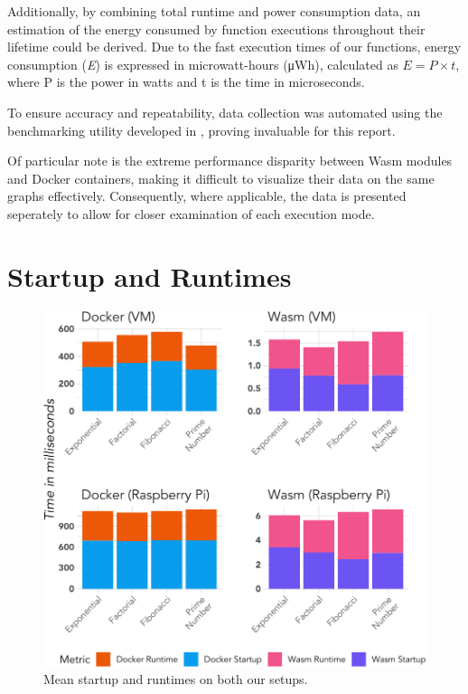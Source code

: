 \documentclass[
  table]{report}
\begin{document}
Additionally, by combining total runtime and power consumption data, an
estimation of the energy consumed by function executions throughout
their lifetime could be derived. Due to the fast execution times of our
functions, energy consumption (\emph{E}) is expressed in microwatt-hours
(μWh), calculated as \(E = P
\times t\), where P is the power in watts and t is the time in
microseconds.

To ensure accuracy and repeatability, data collection was automated
using the benchmarking utility developed in ,
proving invaluable for this report.

Of particular note is the extreme performance disparity between
\ac{Wasm} modules and Docker containers, making it difficult to
visualize their data on the same graphs effectively. Consequently, where
applicable, the data is presented seperately to allow for closer
examination of each execution mode.

\section{Startup and Runtimes}

\begin{figure}[H]

{\centering \includegraphics{thesis_files/figure-latex/avg-efficiency-nrec-rpi-1} 

}

\caption{Mean startup and runtimes on both our setups.}\label{fig:avg-efficiency-nrec-rpi}
\end{figure}
\end{document}
